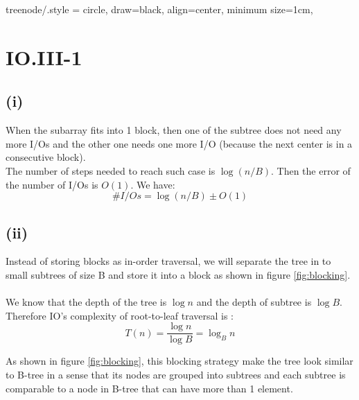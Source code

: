 
\tikzset
{
    treenode/.style = {circle, draw=black, align=center, minimum size=1cm},
}

\section*{IO.III-1}

\subsection*{(i)}
When the subarray fits into 1 block, then one of the subtree does not need any more I/Os and the other one needs one more I/O (because the next center is in a consecutive block).\\ 

The number of steps needed to reach such case is $\log(n/B)$. Then the error of the number of I/Os is $O(1)$. We have:
$$\#I/Os = \log(n/B) \pm O(1)$$

\subsection*{(ii)}
Instead of storing blocks as in-order traversal, we will separate the tree in to small subtrees of size B and store it into a block as shown in figure \ref{fig:blocking}.\\
\\We know that the depth of the tree is $\log n$ and the depth of subtree is $\log B$. Therefore IO's complexity of root-to-leaf traversal is :
$$T(n) = \frac{\log n}{\log B} = \log_{B} n$$

As shown in figure \ref{fig:blocking}, this blocking strategy make the tree look similar to B-tree in a sense that
its nodes are grouped into subtrees and each subtree is comparable to a node in B-tree that can have more than 1 element.

